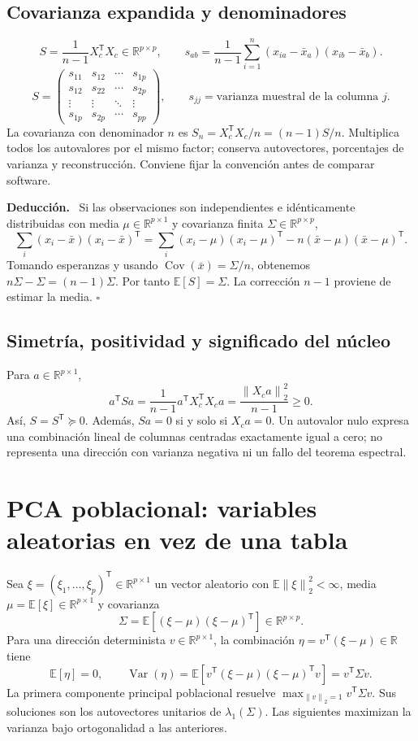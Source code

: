 \documentclass[11pt,a4paper]{article}
\newcommand{\R}{\mathbb R}
\newcommand{\E}{\mathbb E}
\newcommand{\T}{^{\mathsf T}}
\newcommand{\norm}[1]{\left\lVert #1\right\rVert}
\DeclareMathOperator{\Var}{Var}
\DeclareMathOperator{\Cov}{Cov}
\newenvironment{deduccion}{\par\textbf{Deducción.}\ }{\hfill$\square$\par}
\theoremstyle{definition}
\begin{document}
\subsection{Covarianza expandida y denominadores}
\[
\boxed{S=\frac1{n-1}X_c\T X_c\in\R^{p\times p}},\qquad
s_{ab}=\frac1{n-1}\sum_{i=1}^n(x_{ia}-\bar x_a)(x_{ib}-\bar x_b).
\]
\[
S=\begin{pmatrix}s_{11}&s_{12}&\cdots&s_{1p}\\s_{12}&s_{22}&\cdots&s_{2p}\\\vdots&\vdots&\ddots&\vdots\\s_{1p}&s_{2p}&\cdots&s_{pp}\end{pmatrix},\qquad
s_{jj}=\text{varianza muestral de la columna }j.
\]
La covarianza con denominador $n$ es $S_n=X_c\T X_c/n=(n-1)S/n$. Multiplica todos los autovalores por el mismo factor; conserva autovectores, porcentajes de varianza y reconstrucción. Conviene fijar la convención antes de comparar software.
\begin{deduccion}
Si las observaciones son independientes e idénticamente distribuidas con media $\mu\in\R^{p\times1}$ y covarianza finita $\Sigma\in\R^{p\times p}$,
\[
\sum_i(x_i-\bar x)(x_i-\bar x)\T
=\sum_i(x_i-\mu)(x_i-\mu)\T-n(\bar x-\mu)(\bar x-\mu)\T.
\]
Tomando esperanzas y usando $\Cov(\bar x)=\Sigma/n$, obtenemos $n\Sigma-\Sigma=(n-1)\Sigma$. Por tanto $\E[S]=\Sigma$. La corrección $n-1$ proviene de estimar la media.
\end{deduccion}
\subsection{Simetría, positividad y significado del núcleo}
Para $a\in\R^{p\times1}$,
\[
a\T Sa=\frac1{n-1}a\T X_c\T X_ca=\frac{\norm{X_ca}_2^2}{n-1}\ge0.
\]
Así, $S=S\T\succeq0$. Además, $Sa=0$ si y solo si $X_ca=0$. Un autovalor nulo expresa una combinación lineal de columnas centradas exactamente igual a cero; no representa una dirección con varianza negativa ni un fallo del teorema espectral.

\section{PCA poblacional: variables aleatorias en vez de una tabla}
Sea $\xi=(\xi_1,\ldots,\xi_p)\T\in\R^{p\times1}$ un vector aleatorio con $\E\norm\xi_2^2<\infty$, media $\mu=\E[\xi]\in\R^{p\times1}$ y covarianza
\[
\Sigma=\E[(\xi-\mu)(\xi-\mu)\T]\in\R^{p\times p}.
\]
Para una dirección determinista $v\in\R^{p\times1}$, la combinación $\eta=v\T(\xi-\mu)\in\R$ tiene
\[
\E[\eta]=0,\qquad \Var(\eta)=\E[v\T(\xi-\mu)(\xi-\mu)\T v]=v\T\Sigma v.
\]
La primera componente principal poblacional resuelve $\max_{\norm v_2=1}v\T\Sigma v$. Sus soluciones son los autovectores unitarios de $\lambda_1(\Sigma)$. Las siguientes maximizan la varianza bajo ortogonalidad a las anteriores.
\end{document}
